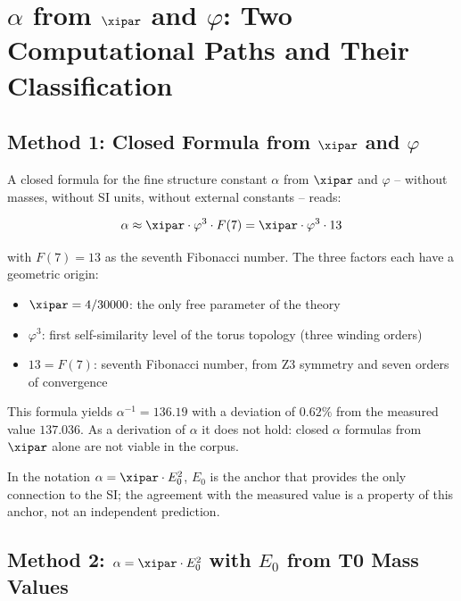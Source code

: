 \section{\texorpdfstring{$\alpha$ from $\xipar$ and $\varphi$: Two Computational Paths and Their Classification}{alpha from xi and phi: Two Computational Paths and Their Classification}}

\subsection{\texorpdfstring{Method 1: Closed Formula from $\xipar$ and $\varphi$}{Method 1: Closed Formula from xi and phi}}

A closed formula for the fine structure constant $\alpha$ from $\xipar$ and $\varphi$ -- without masses, without SI units, without external constants -- reads:

\begin{equation}
  \alpha \approx \xipar \cdot \varphi^3 \cdot F(7) = \xipar \cdot \varphi^3 \cdot 13
\end{equation}

with $F(7) = 13$ as the seventh Fibonacci number. The three factors each have a geometric origin:
\begin{itemize}[noitemsep]
  \item $\xipar = 4/30000$: the only free parameter of the theory
  \item $\varphi^3$: first self-similarity level of the torus topology (three winding orders)
  \item $13 = F(7)$: seventh Fibonacci number, from Z3 symmetry and seven orders of convergence
\end{itemize}

This formula yields $\alpha^{-1} = 136.19$ with a deviation of $0.62\%$ from the measured value $137.036$. As a derivation of $\alpha$ it does not hold: closed $\alpha$ formulas from $\xipar$ alone are not viable in the corpus.

\medskip
In the notation $\alpha = \xipar \cdot E_0^2$, $E_0$ is the anchor that provides the only connection to the SI; the agreement with the measured value is a property of this anchor, not an independent prediction.

\subsection{\texorpdfstring{Method 2: $\alpha = \xipar \cdot E_0^2$ with $E_0$ from T0 Mass Values}{Method 2: alpha = xi E0 squared with E0 from T0 Mass Values}}

